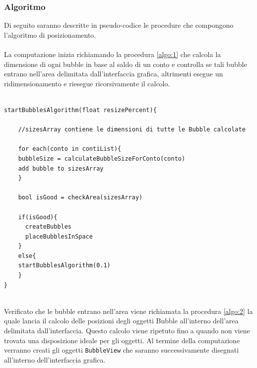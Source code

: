\subsubsection{Algoritmo}
Di seguito saranno descritte in pseudo-codice le procedure che compongono l'algoritmo di posizionamento.
\\\\
La computazione inizia richiamando la procedura \ref{algo:1} che calcola la dimensione di ogni bubble in base al saldo di un conto e controlla se tali bubble entrano  nell'area delimitata dall'interfaccia grafica, altrimenti esegue un ridimensionamento e riesegue ricorsivamente il calcolo.
\begin{lstlisting}[label=algo:1,caption=startBubblesAlgorithm,breaklines=true]

startBubblesAlgorithm(float resizePercent){
    
    //sizesArray contiene le dimensioni di tutte le Bubble calcolate
    
    for each(conto in contiList){
	bubbleSize = calculateBubbleSizeForConto(conto)
	add bubble to sizesArray
    }
  
    bool isGood = checkArea(sizesArray)
    
    if(isGood){
      createBubbles
      placeBubblesInSpace
    }
    else{
	startBubblesAlgorithm(0.1)
    }
}


\end{lstlisting}

Verificato che le bubble entrano nell'area viene richiamata la procedura \ref{algo:2} la quale lancia il calcolo delle posizioni degli oggetti Bubble all'interno dell'area delimitata dall'interfaccia. Questo calcolo viene ripetuto fino a quando non viene trovata una disposizione ideale per gli oggetti. Al termine della computazione verranno creati gli oggetti \texttt{BubbleView} che saranno successivamente disegnati all'interno dell'interfaccia grafica.

